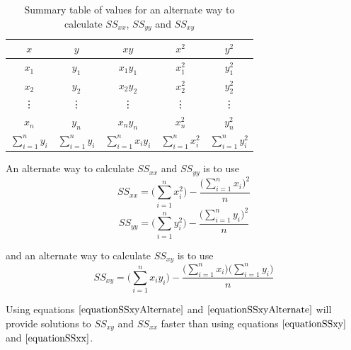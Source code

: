 \begin{nt}

\begin{table}[H]
\begin{center}
\begin{tabular}{ c | c | c  | c | c}
\hline
$~x~$	&	$~y~$	& 	$~xy~$			&	$~x^{2}~$		&	$~y^{2}~$	\\
\hline
$x_{1}$	&	$y_{1}$	&	$~x_{1}y_{1}~$		&	$~x_{1}^{2}~$	&	$y_{1}^{2}$	\\
$x_{2}$	&	$y_{2}$	&	$~x_{2}y_{2}~$		&	$~x_{2}^{2}~$	&	$y_{2}^{2}$	\\
\vdots	&	\vdots	&	\vdots			&	\vdots		&	\vdots			\\
$x_{n}$	&	$y_{n}$	&	$~x_{n}y_{n}~$		&	$~x_{n}^{2}~$	&	$y_{n}^{2}$	\\
\hline
	$\displaystyle\sum_{i=1}^{n} y_{i}$
		&	$\displaystyle\sum_{i=1}^{n} y_{i}$
		&	$\displaystyle\sum_{i=1}^{n} x_{i}y_{i}$	
		&	$\displaystyle\sum_{i=1}^{n} x_{i}^{2}$
		&	$\displaystyle\sum_{i=1}^{n} y_{i}^{2}$	\\
\end{tabular}
\end{center}
\caption{Summary table of values for an alternate way to calculate $SS_{xx}$, $SS_{yy}$ and $SS_{xy}$}
\end{table}

An alternate way to calculate $SS_{xx}$ and $SS_{yy}$ is to use
	\begin{equation}
	\label{equationSSxxAlternate}	
	SS_{xx} = \bigg( \displaystyle \sum_{i=1}^{n} x_{i}^{2} \bigg)
		- \frac{ \bigg( \displaystyle \sum_{i=1}^{n} x_{i} \bigg)^{2} }{n}
	\end{equation}
\hfill
	\begin{equation}
	\label{equationSSyyAlternate}	
	SS_{yy} = \bigg( \displaystyle \sum_{i=1}^{n} y_{i}^{2} \bigg)
		- \frac{ \bigg( \displaystyle \sum_{i=1}^{n} y_{i} \bigg)^{2} }{n}
	\end{equation}
\hfill

\noindent
and an alternate way to calculate $SS_{xy}$ is to use
	\begin{equation}
	\label{equationSSxyAlternate}
	SS_{xy} = \bigg( \displaystyle \sum_{i=1}^{n} x_{i}y_{i} \bigg)
			- \frac{ \bigg( \sum_{i=1}^{n} x_{i} \bigg) \bigg( \sum_{i=1}^{n} y_{i} \bigg) }{n}
	\end{equation}

\hfill

\noindent
Using equations $\ref{equationSSxyAlternate}$
and $\ref{equationSSxyAlternate}$
will provide solutions to $SS_{xy}$ and $SS_{xx}$
faster than using equations
$\ref{equationSSxy}$
and
$\ref{equationSSxx}$.
\end{nt}


